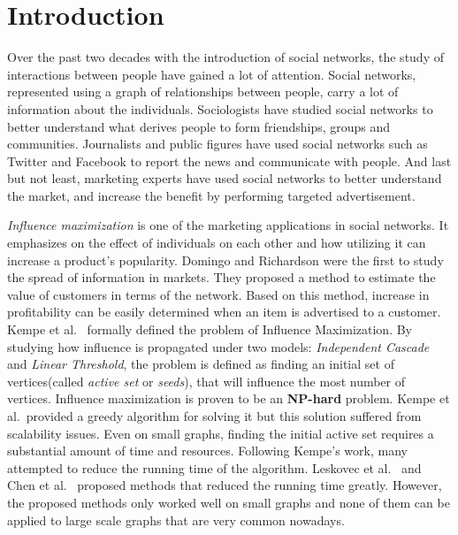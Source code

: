 \documentclass[english]{tktltiki}
\begin{document}
\mytableofcontents
% 
\section{Introduction}
Over the past two decades with the introduction of social networks, the study of interactions between people have gained a lot of attention.
Social networks, represented using a graph of relationships between people, carry a lot of information about the individuals. 
Sociologists have studied social networks to better understand what derives people to form friendships, groups and communities.
Journalists and public figures have used social networks such as Twitter and Facebook to report the news and communicate with people. 
And last but not least, marketing experts have used social networks to better understand the market, and increase the benefit by performing targeted advertisement.

\textit{Influence maximization} is one of the marketing applications in social networks. 
It emphasizes on the effect of individuals on each other and how utilizing it can increase a product's popularity. 
Domingo and Richardson \cite{domingo01} were the first to study the spread of information in markets. 
They proposed a method to estimate the value of customers in terms of the network.
Based on this method, increase in profitability can be easily determined when an item is advertised to a customer.
Kempe et al.\ \cite{kempe03} formally defined the problem of Influence Maximization.
By studying how influence is propagated under two models: \textit{Independent Cascade} and \textit{Linear Threshold}, the problem is defined as finding an initial set of vertices(called \textit{active set} or \textit{seeds}), that will influence the most number of vertices.
Influence maximization is proven to be an \textbf{NP-hard} problem. 
Kempe et al.\ provided a greedy algorithm for solving it but this solution suffered from scalability issues. 
Even on small graphs, finding the initial active set requires a substantial amount of time and resources.
Following Kempe's work, many attempted to reduce the running time of the algorithm. 
Leskovec et al.\ \cite{leskovec07} and Chen et al.\ \cite{chen09} proposed methods that reduced the running time greatly. 
However, the proposed methods only worked well on small graphs and none of them can be applied to large scale graphs that are very common nowadays.
\end{document}
